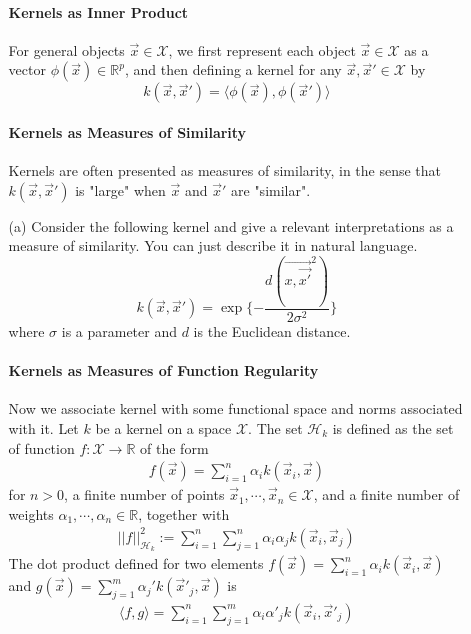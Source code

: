\documentclass[10pt]{article}
\begin{document}
\begin{enumerate}
\begin{itemize}
\paragraph{Kernels as Inner Product}For general objects \(\vec x\in\mathcal{X}\), we first represent each object \(\vec x\in\mathcal{X}\) as a vector $\phi(\vec{x})\in \mathbb{R}^p$, and then defining a kernel for any $\vec x, \vec x' \in\mathcal{X}$ by
\[k(\vec{x},\vec{x}') = \langle \phi(\vec{x}),\phi(\vec{x}') \rangle\]

\paragraph{Kernels as Measures of Similarity}Kernels are often presented as measures of similarity, in the sense that $k(\vec{x},\vec{x}')$ is "large" when $\vec x$ and $\vec x'$
are "similar".
\item[(a)] Consider the following kernel and give a relevant interpretations as a measure of similarity. You can just describe it in natural language.
\[k(\vec{x},\vec{x}') = \exp\{-\frac{d(\vec{x,\vec{x'}}^2)}{2\sigma^2}\}\]
where $\sigma$ is a parameter and $d$ is the Euclidean distance.

\paragraph{Kernels as Measures of Function Regularity} Now we associate kernel with some functional space and norms associated with it. Let $k$ be a kernel on a space $\mathcal{X}$. The set $\mathcal{H}_k$ is defined as the set of function $f:\mathcal{X}\to \mathbb{ R}$ of the form
\begin{align*}
    f(\vec x) = \sum_{i = 1}^n \alpha_i k(\vec{x}_i,\vec x) 
\end{align*}
for $n > 0$, a finite number of points $\vec x_1,\cdots, \vec x_n \in\mathcal{X}$, and a finite number of weights $\alpha_1,\cdots,\alpha_n\in \mathbb{ R}$, together with
\begin{align*}
    ||f ||^2_{\mathcal{H}_k} :=  \sum_{i = 1}^n\sum_{j = 1}^n \alpha_i\alpha_jk (\vec x_i,\vec x_j) 
\end{align*}
The dot product defined for two elements $f(\vec x) = \sum_{i = 1}^n \alpha_i k(\vec{x}_i,\vec x) $ and $g(\vec x) = \sum_{j = 1}^m \alpha_j' k(\vec{x}'_j,\vec x)$ is
\begin{align*}
    \langle f,g \rangle = \sum_{i = 1}^n\sum_{j = 1}^m\alpha_i\alpha'_jk(\vec{x}_i,\vec{x}'_j)
\end{align*}


\end{itemize}
\end{enumerate}
\end{document}
